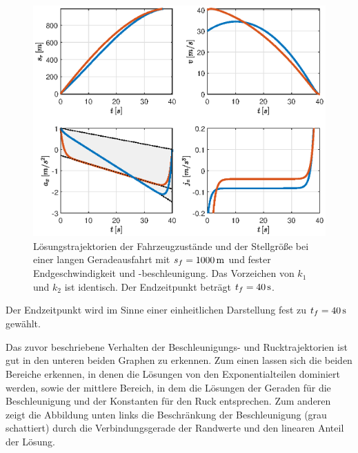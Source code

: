 \begin{figure}[h] 
	\centering
	\includegraphics[width=0.95\linewidth]{./Bilder/Ergebnisse/Geradeausfahrt/vf_af_fest_gleiches_VZ.eps}
	\caption{Lösungstrajektorien der Fahrzeugzustände und der Stellgröße bei einer langen Geradeausfahrt mit $s_f=1000\,\mathrm{m}$ und fester Endgeschwindigkeit und -beschleunigung. Das Vorzeichen von $k_1$ und $k_2$ ist identisch. Der Endzeitpunkt beträgt $t_f = 40\,\mathrm{s}$.}
	\label{fig:vf_af_fest_gleiches_VZ}
\end{figure}
Der Endzeitpunkt wird im Sinne einer einheitlichen Darstellung fest zu $t_f = 40\,\mathrm{s}$ gewählt. 

Das zuvor beschriebene Verhalten der Beschleunigungs- und Rucktrajektorien ist gut in den unteren beiden Graphen zu erkennen. Zum einen lassen sich die beiden Bereiche erkennen, in denen die Lösungen von den Exponentialteilen dominiert werden, sowie der mittlere Bereich, in dem die Lösungen der Geraden für die Beschleunigung und der Konstanten für den Ruck entsprechen. Zum anderen zeigt die Abbildung unten links die Beschränkung der Beschleunigung (grau schattiert) durch die Verbindungsgerade der Randwerte und den linearen Anteil der Lösung.

